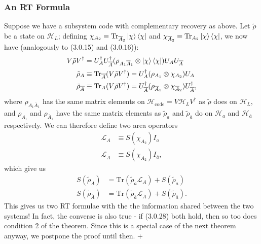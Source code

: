 \documentclass[12pt,a4paper]{report}
\numberwithin{equation}{section}
\newcommand{\ketbra}[2]{\ket{#1}\bra{#2}}
\newcommand{\ketbras}[1]{\ketbra{#1}{#1}}
\newcommand{\Hcode}{\mathcal{H}_{\text{code}}}
\newcommand{\ol}[1]{\overline{#1}}
\newcommand{\tr}{\text{Tr}}
\theoremstyle{definition}
\theoremstyle{theorem}
\theoremstyle{theorem}
\theoremstyle{example}
\theoremstyle{definition}
\begin{document}
\subsubsection{An RT Formula}
Suppose we have a subsystem code with complementary recovery as above. Let $\tilde{\rho}$ be a state on $\mathcal{H}_{L}$; defining $\chi_{A_{2}}\equiv\tr_{\ol{A}_{2}}\ketbras{\chi}$ and $\chi_{\ol{A}_{2}}\equiv\tr_{A_{2}}\ketbras{\chi}$, we now have (analogously to (3.0.15) and (3.0.16)):
\begin{equation}
	\begin{aligned}
		V\tilde{\rho}V^{\dagger}&=U_{A}^{\dagger}U_{\ol{A}}^{\dagger}(\rho_{A_{1}\ol{A}_{1}}\otimes\ketbras{\chi})U_{A}U_{\ol{A}}\\
		\tilde{\rho}_{A}&\equiv\tr_{\ol{A}}(V\tilde{\rho}V^{\dagger})=U_{A}^{\dagger}(\rho_{A_{1}}\otimes\chi_{A_{2}})U_{A}\\
		\tilde{\rho}_{\ol{A}}&\equiv\tr_{A}(V\tilde{\rho}V^{\dagger})=U_{\ol{A}}^{\dagger}(\rho_{\ol{A}_{1}}\otimes\chi_{\ol{A}_{2}})U_{\ol{A}}^{\dagger},
	\end{aligned}
\end{equation}
where $\rho_{A_{1}\ol{A}_{1}}$ has the same matrix elements on $\Hcode=V\mathcal{H}_{L}V^{\dagger}$ as $\tilde{\rho}$ does on $\mathcal{H}_{L}$, and $\rho_{A_{1}}$ and $\rho_{\ol{A}_{1}}$ have the same matrix elements as $\tilde{\rho}_{a}$ and $\tilde{\rho}_{\ol{a}}$ do on $\mathcal{H}_{a}$ and $\mathcal{H}_{\ol{a}}$ respectively. We can therefore define two area operators
\begin{equation}
	\begin{aligned} 
		\mathcal{L}_{A}&\equiv S(\chi_{A_{2}})I_{a}\\
		\mathcal{L}_{\ol{A}}&\equiv S(\chi_{A_{2}})I_{\ol{a}},
	\end{aligned}
\end{equation}
which give us
\begin{equation}
	\begin{aligned}
		S(\tilde{\rho}_{A})&=\tr(\tilde{\rho}_{a}\mathcal{L}_{A})+S(\tilde{\rho}_{a})\\
		S(\tilde{\rho}_{\ol{A}})&=\tr(\tilde{\rho}_{\ol{a}}\mathcal{L}_{\ol{A}})+S(\tilde{\rho}_{\ol{a}}).
	\end{aligned}
\end{equation}
This gives us two RT formulae with the the information shared between the two systems! In fact, the converse is also true - if (3.0.28) both hold, then so too does condition 2 of the theorem. Since this is a special case of the next theorem anyway, we postpone the proof until then. +
\end{document}
